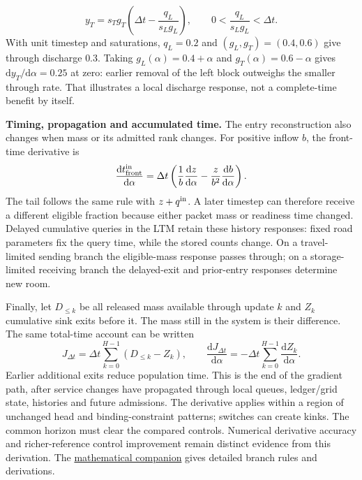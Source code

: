 \documentclass[10pt,a4paper]{article}
\newenvironment{revision}{\begingroup\color{revisionred}}{\par\endgroup}
\begin{document}
\begin{equation}
 y_T=s_Tg_T\left(\Delta t-\frac{q_L}{s_Lg_L}\right),
 \qquad 0<\frac{q_L}{s_Lg_L}<\Delta t.
 \label{eq:compact-service}
\end{equation}
\begin{revision}
With unit timestep and saturations, $q_L=0.2$ and
$(g_L,g_T)=(0.4,0.6)$ give through discharge $0.3$.
Taking $g_L(\alpha)=0.4+\alpha$ and $g_T(\alpha)=0.6-\alpha$
gives $\mathrm dy_T/\mathrm d\alpha=0.25$ at zero: earlier removal
of the left block outweighs the smaller through rate. That illustrates
a local discharge response, not a complete-time benefit by itself.

\textbf{Timing, propagation and accumulated time.}
The entry reconstruction also changes when mass or its admitted rank
changes. For positive inflow $b$, the front-time derivative is
\begin{equation}
 \frac{\mathrm dt^{\rm in}_{\rm front}}{\mathrm d\alpha}
 =\Delta t\left(\frac1b\frac{\mathrm dz}{\mathrm d\alpha}
       -\frac z{b^2}\frac{\mathrm db}{\mathrm d\alpha}\right).
 \label{eq:compact-entry-derivative}
\end{equation}
The tail follows the same rule with $z+q^{\rm in}$. A later timestep
can therefore receive a different eligible fraction because either
packet mass or readiness time changed. Delayed cumulative queries in the
LTM retain these history responses: fixed road parameters fix the query
time, while the stored counts change. On a travel-limited sending branch
the eligible-mass response passes through; on a storage-limited receiving
branch the delayed-exit and prior-entry responses determine new room.

Finally, let $D_{\leq k}$ be all released mass available through update
$k$ and $Z_k$ cumulative sink exits before it. The mass still in the
system is their difference. The same total-time account can be written
\begin{equation}
 J_{\Delta t}=\Delta t\sum_{k=0}^{H-1}(D_{\leq k}-Z_k),\qquad
 \frac{\mathrm dJ_{\Delta t}}{\mathrm d\alpha}
 =-\Delta t\sum_{k=0}^{H-1}\frac{\mathrm dZ_k}{\mathrm d\alpha}.
 \label{eq:compact-objective-derivative}
\end{equation}
Earlier additional exits reduce population time. This is the end of the
gradient path, after service changes have propagated through local queues,
ledger/grid state, histories and future admissions. The derivative applies
within a region of unchanged head and binding-constraint patterns; switches
can create kinks. The common horizon must clear the compared controls.
Numerical derivative accuracy and richer-reference control improvement
remain distinct evidence from this derivation. The
\href{urban_methodology_specification.pdf}{mathematical companion}
gives detailed branch rules and derivations.
\end{revision}
\end{document}
